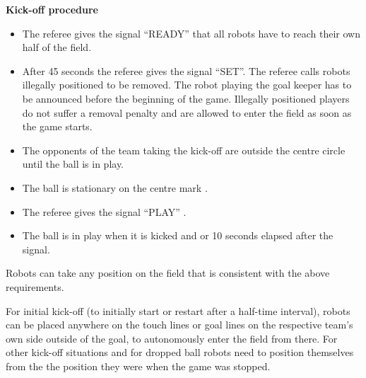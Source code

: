 \bigskip
 
{\bfseries Kick-off procedure}

\begin{itemize}
\item The referee gives the signal ``READY'' that all robots have to reach their
      own half of the field.
\item After  45 seconds the referee gives the signal ``SET''.
      The referee calls robots illegally positioned to be removed.
      The robot playing the goal keeper has to be announced before the beginning
      of the game.
      Illegally positioned players do not suffer a removal penalty and are
      allowed to enter the field as soon as the game starts.
\item The opponents of the team taking the kick-off are outside the centre circle until the ball is in play.
\item The ball is  stationary on the centre mark . 
\item The referee gives the signal ``PLAY''  .
\item The ball is in play when it is kicked and   or 10 seconds elapsed after the signal.
\end{itemize}

Robots can take any position on the field that is consistent with the above requirements.


\bigskip
 
For initial kick-off (to initially start or restart after a half-time interval),
robots can be placed anywhere on the touch lines or goal lines on the respective
team's own side outside of the goal,
to autonomously enter the field from there. 
For other kick-off situations and for dropped ball robots need to
position themselves from the the position they were when the game was stopped.


\bigskip

